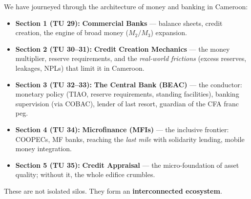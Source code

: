 \documentclass[11pt]{article}
\begin{document}
We have journeyed through the architecture of money and banking in Cameroon:
\begin{itemize}
    \item \textbf{Section 1 (TU 29):} \textbf{Commercial Banks} — balance sheets, credit creation, the engine of broad money ($M_2/M_3$) expansion.
    \item \textbf{Section 2 (TU 30--31):} \textbf{Credit Creation Mechanics} — the money multiplier, reserve requirements, and the \emph{real-world frictions} (excess reserves, leakages, NPLs) that limit it in Cameroon.
    \item \textbf{Section 3 (TU 32--33):} \textbf{The Central Bank (BEAC)} — the conductor: monetary policy (TIAO, reserve requirements, standing facilities), banking supervision (via COBAC), lender of last resort, guardian of the CFA franc peg.
    \item \textbf{Section 4 (TU 34):} \textbf{Microfinance (MFIs)} — the inclusive frontier: COOPECs, MF banks, reaching the \emph{last mile} with solidarity lending, mobile money integration.
    \item \textbf{Section 5 (TU 35):} \textbf{Credit Appraisal} — the micro-foundation of asset quality; without it, the whole edifice crumbles.
\end{itemize}

These are not isolated silos. They form an \textbf{interconnected ecosystem}.
\end{document}
